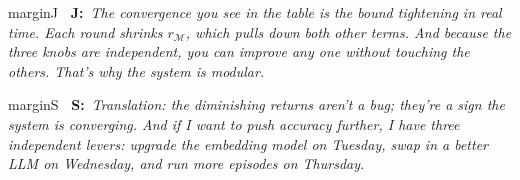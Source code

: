 \documentclass[11pt,a4paper]{article}
\newcommand{\profJ}[1]{%
  \begin{inlinenote}{marginJ}%
  \textbf{\color{marginJ}\faGraduationCap~J:}~\textit{#1}%
  \end{inlinenote}%
}
\newcommand{\seniorS}[1]{%
  \begin{inlinenote}{marginS}%
  \textbf{\color{marginS}\faServer~S:}~\textit{#1}%
  \end{inlinenote}%
}
\begin{document}
\begin{bridgebox}
\begin{center}
\end{center}

\profJ{The convergence you see in the table is the bound tightening in real time. Each round shrinks $r_\mathcal{M}$, which pulls down both other terms. And because the three knobs are \emph{independent}, you can improve any one without touching the others. That's why the system is modular.}

\seniorS{Translation: the diminishing returns aren't a bug; they're a sign the system is converging. And if I want to push accuracy further, I have three independent levers: upgrade the embedding model on Tuesday, swap in a better LLM on Wednesday, and run more episodes on Thursday.}

\end{bridgebox}
\end{document}
